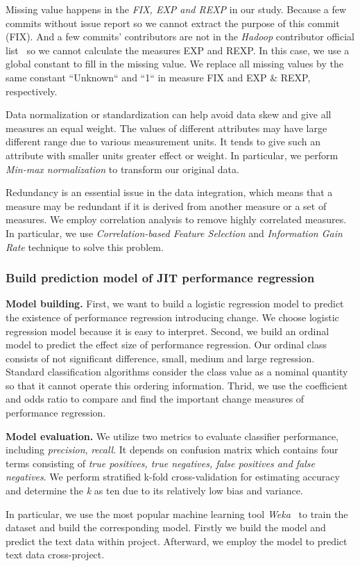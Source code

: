 Missing value happens in the \emph{FIX, EXP and REXP} in our study. Because a few commits without issue report so we cannot extract the purpose of this commit (FIX). And a few commits' contributors are not in the \emph{Hadoop} contributor official list~\cite{hadoop_2017} so we cannot calculate the measures EXP and REXP. In this case, we use a global constant to fill in the missing value. We replace all missing values by the same constant ``Unknown`` and ``1`` in measure FIX and EXP \& REXP, respectively.

Data normalization or standardization can help avoid data skew and give all measures an equal weight. The values of different attributes may have large different range due to various measurement units. It tends to give such an attribute with smaller units greater effect or weight. In particular, we perform \emph{Min-max normalization} to transform our original data.

Redundancy is an essential issue in the data integration, which means that a measure may be redundant if it is derived from another measure or a set of measures. We employ correlation analysis to remove highly correlated measures. In particular, we use \emph{Correlation-based Feature Selection} and \emph{Information Gain Rate} technique to solve this problem.

\subsubsection{Build prediction model of JIT performance regression}

\textbf{Model building.} First, we want to build a logistic regression model to predict the existence of performance regression introducing change. We choose logistic regression model because it is easy to interpret. Second, we build an ordinal model to predict the effect size of performance regression. Our ordinal class consists of not significant difference, small, medium and large regression. Standard classification algorithms consider the class value as a nominal quantity so that it cannot operate this ordering information. Thrid, we use the coefficient and odds ratio to compare and find the important change measures of performance regression.

\textbf{Model evaluation.} We utilize two metrics to evaluate classifier performance, including \emph{precision}, \emph{recall}. It depends on confusion matrix which contains four terms consisting of \emph{true positives, true negatives, false positives and false negatives}. 
We perform stratified k-fold cross-validation for estimating accuracy and determine the \emph{k} as ten due to its relatively low bias and variance.


In particular, we use the most popular machine learning tool \emph{Weka}~\cite{Hall:2009:weka} to train the dataset and build the corresponding model. Firstly we build the model and predict the text data within project. Afterward, we employ the model to predict text data cross-project.


